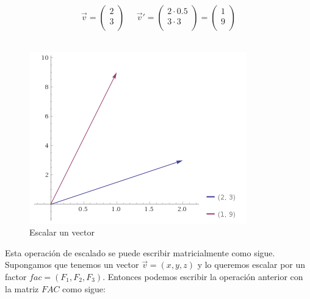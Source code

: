 \begin{equation}
	\label{eq:scaling}
	\overrightarrow{v} = 
	\left( \begin{array}{c}
			2 \\
			3 \\
	\end{array} \right)
	\;\;\;\;\;
	\overrightarrow{v}' =
	\left( \begin{array}{c}
		2\cdot0.5 \\
		3\cdot3 \\
	\end{array}	\right) =  
	\left( \begin{array}{c}
			1 \\
			9 \\
	\end{array} \right)
\end{equation}\\

\begin{figure}[h]
	\centering
	\includegraphics{figures/scaling.png}
	\caption{Escalar un vector}
	\label{fig:scaling}
\end{figure}

Esta operación de escalado se puede escribir matricialmente como sigue.
Supongamos que tenemos un vector $\overrightarrow{v}=(x,y,z)$ y lo queremos
escalar por un factor $fac=(F_1,F_2,F_3)$. Entonces podemos escribir la
operación anterior con la matriz $FAC$ como sigue:\\

